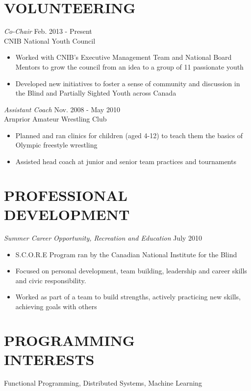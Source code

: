 \documentclass[margin]{res}
\begin{document}
\begin{resume}
\section{VOLUNTEERING}
{\sl Co-Chair} \hfill Feb. 2013 - Present\\
CNIB National Youth Council
\begin{itemize}\itemsep -2pt
	\item Worked with CNIB's Executive Management Team and National Board Mentors to grow the council from an idea to a group of 11 passionate youth
  \item Developed new initiatives to foster a sense of community and discussion in the Blind and Partially Sighted Youth across Canada
\end{itemize}

{\sl Assistant Coach} \hfill Nov. 2008 - May 2010\\
Arnprior Amateur Wrestling Club
\begin{itemize}\itemsep -2pt
  \item Planned and ran clinics for children (aged 4-12) to teach them the basics of Olympic freestyle wrestling
  \item Assisted head coach at junior and senior team practices and tournaments
\end{itemize}

\section{PROFESSIONAL DEVELOPMENT}
{\sl Summer Career Opportunity, Recreation and Education} \hfill July 2010
\begin{itemize} \itemsep -2pt
  \item S.C.O.R.E Program ran by the Canadian National Institute for the Blind
  \item Focused on personal development, team building, leadership and career skills and civic responsibility.
  \item Worked as part of a team to build strengths, actively practicing new skills, achieving goals with others
\end{itemize}

\section{PROGRAMMING\\INTERESTS}
Functional Programming, Distributed Systems, Machine Learning

\end{resume}
\end{document}
